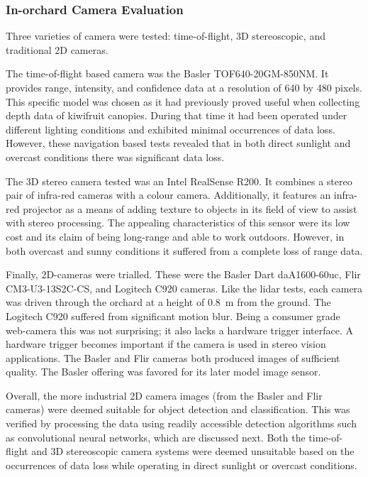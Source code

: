 \documentclass[preprint,authoryear,12pt]{elsarticle}
\begin{document}
    \subsubsection{In-orchard Camera Evaluation}
        \label{sect:camera_evaluation}

        Three varieties of camera were tested: time-of-flight, 3D stereoscopic, and traditional 2D cameras.

        The time-of-flight based camera was the Basler TOF640-20GM-850NM.
        It provides range, intensity, and confidence data at a resolution of 640 by 480 pixels.
        This specific model was chosen as it had previously proved useful when collecting depth data of kiwifruit canopies.
        During that time it had been operated under different lighting conditions and exhibited minimal occurrences of data loss.
        However, these navigation based tests revealed that in both direct sunlight and overcast conditions there was significant data loss.

        The 3D stereo camera tested was an Intel RealSense R200.
        It combines a stereo pair of infra-red cameras with a colour camera.
        Additionally, it features an infra-red projector as a means of adding texture to objects in its field of view to assist with stereo processing.
        The appealing characteristics of this sensor were its low cost and its claim of being long-range and able to work outdoors.
        However, in both overcast and sunny conditions it suffered from a complete loss of range data.

        Finally, 2D-cameras were trialled.
        These were the Basler Dart daA1600-60uc, Flir CM3-U3-13S2C-CS, and Logitech C920 cameras.
        Like the lidar tests, each camera was driven through the orchard at a height of \SI{0.8}{\meter} from the ground.
        The Logitech C920 suffered from significant motion blur.
        Being a consumer grade web-camera this was not surprising; it also lacks a hardware trigger interface.
        A hardware trigger becomes important if the camera is used in stereo vision applications.
        The Basler and Flir cameras both produced images of sufficient quality.
        The Basler offering was favored for its later model image sensor.

        Overall, the more industrial 2D camera images (from the Basler and Flir cameras) were deemed suitable for object detection and classification.
        This was verified by processing the data using readily accessible detection algorithms such as convolutional neural networks, which are discussed next.
        Both the time-of-flight and 3D stereoscopic camera systems were deemed unsuitable based on the occurrences of data loss while operating in direct sunlight or overcast conditions.
\end{document}
